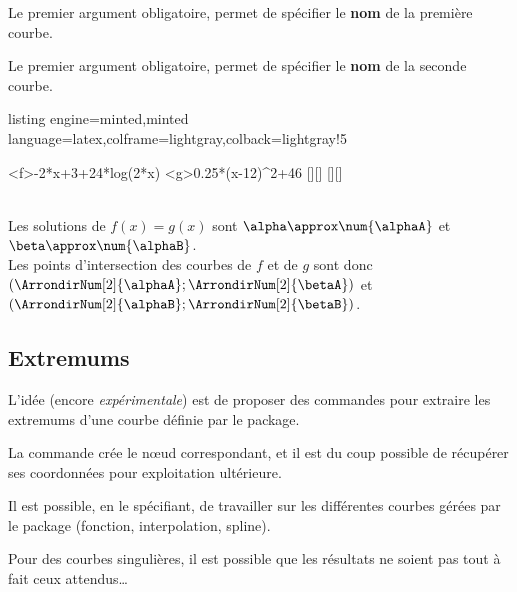 \documentclass[11pt,a4paper]{ltxdoc}
\begin{document}
\smallskip

Le premier argument obligatoire, permet de spécifier le \textbf{nom} de la première courbe.

\smallskip

Le premier argument obligatoire, permet de spécifier le \textbf{nom} de la seconde courbe.

\begin{tcblisting}{listing engine=minted,minted language=latex,colframe=lightgray,colback=lightgray!5}
\begin{GraphiqueTikz}%
	[x=0.9cm,y=0.425cm,Xmin=4,Xmax=20,Origx=4,
	Ymin=40,Ymax=56,Ygrille=2,Ygrilles=1,Origy=40]
	{-2*x+3+24*log(2*x)}
	{0.25*(x-12)^2+46}
	[\alphaA][\betaA]
	[\alphaB][\betaB]
\end{GraphiqueTikz}\\
Les solutions de $f(x)=g(x)$ sont $\alpha \approx \num{\alphaA}$ et
$\beta \approx \num{\alphaB}$.\\
Les points d'intersection des courbes de $f$ et de $g$ sont donc
$(\ArrondirNum[2]{\alphaA};\ArrondirNum[2]{\betaA})$ et
$(\ArrondirNum[2]{\alphaB};\ArrondirNum[2]{\betaB})$.
\end{tcblisting}

\pagebreak

\subsection{Extremums}\label{maximum}\label{minimum}

L'idée (encore \textit{expérimentale}) est de proposer des commandes pour extraire les extremums d'une courbe définie par le package.

La commande crée le nœud correspondant, et il est du coup possible de récupérer ses coordonnées pour exploitation ultérieure.

\smallskip

Il est possible, en le spécifiant, de travailler sur les différentes courbes gérées par le package (fonction, interpolation, spline).

Pour des courbes singulières, il est possible que les résultats ne soient pas tout à fait ceux attendus\ldots
\end{document}
